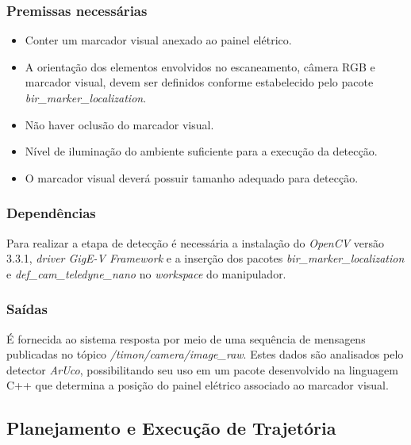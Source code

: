 \subsubsection{Premissas necessárias}
\label{ssub:premA}

\begin{itemize}[itemsep=3pt,parsep=3pt]
  \item Conter um marcador visual anexado ao painel elétrico.
  \item A orientação dos elementos envolvidos no escaneamento, câmera RGB e marcador visual, devem ser definidos conforme estabelecido pelo pacote \textit{bir\_marker\_localization}.
  \item Não haver oclusão do marcador visual.
  \item Nível de iluminação do ambiente suficiente para a execução da detecção.
  \item O marcador visual deverá possuir tamanho adequado para detecção.
\end{itemize}

\subsubsection{Dependências}
\label{ssub:depA}

Para realizar a etapa de detecção é necessária a instalação do \textit{\acs{OpenCV}} versão 3.3.1, \textit{driver GigE-V Framework} e a inserção dos pacotes \textit{bir\_marker\_localization} e \textit{def\_cam\_teledyne\_nano} no \textit{workspace} do manipulador.




\subsubsection{Saídas}
\label{ssub:saidaA}

É fornecida ao sistema resposta por meio de uma sequência de mensagens publicadas no tópico \textit{/timon/camera/image\_raw}. Estes dados são analisados pelo detector \textit{ArUco}, possibilitando seu uso em um pacote desenvolvido na linguagem C++ que determina a posição do painel elétrico associado ao marcador visual. 



\subsection{Planejamento e Execução de Trajetória}
\label{sub:funcB}

